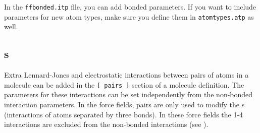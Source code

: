 



In the {\tt ffbonded.itp} file, you can add bonded parameters. If you
want to include parameters for new atom types, make sure you define
them in {\tt atomtypes.atp} as well.



\subsection{s}
\label{subsec:pairinteractions}
Extra Lennard-Jones and electrostatic interactions between pairs
of atoms in a molecule can be added in the {\tt [~pairs~]} section of
a molecule definition. The parameters for these interactions can
be set independently from the non-bonded interaction parameters.
In the {\gromos} force fields, pairs are only used
to modify the s (interactions of atoms
separated by three bonds). In these force fields the 1-4 interactions
are excluded from the non-bonded interactions (see ).

